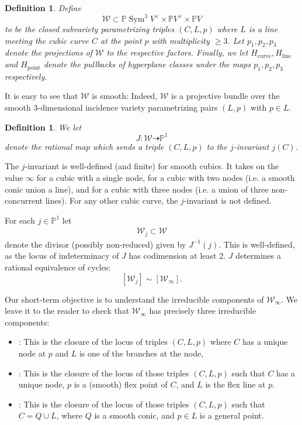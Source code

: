 \documentclass[12 pt, reqno]{amsart}
\newtheorem{defn}[thm]{Definition}
\theoremstyle{definition}
\newcommand{\on}{\operatorname}
\newcommand{\mb}{\mathbb}
\renewcommand{\P}{\mb{P}}
\begin{document}
\begin{defn}
  \label{def:W}
  Define
  \[\mathcal{W} \subset \P \on{Sym}^{3}V^{\vee} \times \P V^{\vee}
    \times \P V\] to be the closed subvariety parametrizing triples
  $(C,L,p)$ where $L$ is a line meeting the cubic curve $C$ at the
  point $p$ with multiplicity $\geq 3$.  Let $p_{1}, p_{2}, p_{3}$
  denote the projections of $\mathcal{W}$ to the respective factors.
  Finally, we let $H_{\on{curve}}, H_{\on{line}}$ and $H_{\on{point}}$
  denote the pullbacks of hyperplane classes under the maps
  $p_{1}, p_{2}, p_{3}$ respectively.
\end{defn}

It is easy to see that $\mathcal{W}$ is smooth: Indeed, $\mathcal{W}$
is a projective bundle over the smooth $3$-dimensional incidence
variety parametrizing pairs $(L,p)$ with $p \in L$.

\begin{defn}
  \label{def:j}
  We let \[J: \mathcal{W} \dashrightarrow \P^1\] denote the rational
  map which sends a triple $(C,L,p)$ to the $j$-invariant $j(C)$.
\end{defn}

The $j$-invariant is well-defined (and finite) for smooth cubics.  It
takes on the value $\infty$ for a cubic with a single node, for a
cubic with two nodes (i.e. a smooth conic union a line), and for a
cubic with three nodes (i.e. a union of three non-concurrent lines).
For any other cubic curve, the $j$-invariant is not defined.

For each $j \in \P^{1}$ let
\begin{align}
  \label{WjW}
  \mathcal{W}_{j} \subset \mathcal{W}
  \end{align}
  denote the divisor (possibly non-reduced) given by $J^{-1}(j)$.
  This is well-defined, as the locus of indeterminacy of $J$ has
  codimension at least $2$.  $J$ determines a rational equivalence of
  cycles:
  \[[\mathcal{W}_{j}] \sim [\mathcal{W}_{\infty}].\]

  Our short-term objective is to understand the irreducible components
  of $\mathcal{W}_{\infty}$.  We leave it to the reader to check that
  $\mathcal{W}_{\infty}$ has precisely three irreducible components:

\begin{itemize}
\item [$\mathcal{W}_{BN, \infty}$]: This is the closure of the locus
  of triples $(C,L,p)$ where $C$ has a unique node at $p$ and $L$ is
  one of the branches at the node,
\item [$\mathcal{W}_{AN, \infty}$]: This is the closure of the locus
  of those triples $(C,L,p)$ such that $C$ has a unique node, $p$ is a
  (smooth) flex point of $C$, and $L$ is the flex line at $p$.
\item [$\mathcal{W}_{\on{conic}}$]: This is the closure of the locus
  of those triples $(C,L,p)$ such that $C = Q \cup L$, where $Q$ is a
  smooth conic, and $p \in L$ is a general point.
\end{itemize}
\end{document}
